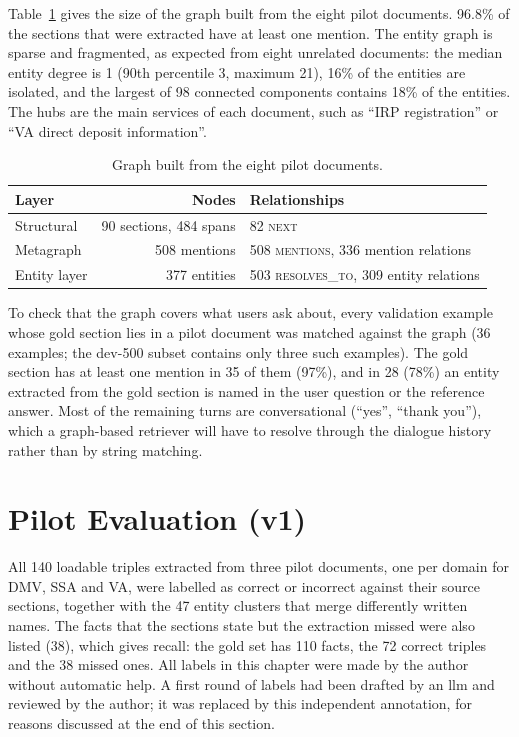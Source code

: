 Table~\ref{tab:kg:build} gives the size of the graph built from the eight pilot
documents. 96.8\% of the sections that were extracted have at least one mention.
The entity graph is sparse and fragmented, as expected from eight unrelated
documents: the median entity degree is 1 (90th percentile 3, maximum 21), 16\% of
the entities are isolated, and the largest of 98 connected components contains
18\% of the entities. The hubs are the main services of each document, such as
``IRP registration'' or ``VA direct deposit information''.

\begin{table}[ht]
    \centering
    \caption{Graph built from the eight pilot documents.}
    \label{tab:kg:build}
    \begin{tabular}{lrl}
        \toprule
        Layer & Nodes & Relationships \\
        \midrule
        Structural & 90 sections, 484 spans & 82 \textsc{next} \\
        Metagraph  & 508 mentions & 508 \textsc{mentions}, 336 mention relations \\
        Entity layer & 377 entities & 503 \textsc{resolves\_to}, 309 entity relations \\
        \bottomrule
    \end{tabular}
\end{table}

To check that the graph covers what users ask about, every validation example whose
gold section lies in a pilot document was matched against the graph (36 examples;
the dev-500 subset contains only three such examples). The gold section has at least
one mention in 35 of them (97\%), and in 28 (78\%) an entity extracted from the gold
section is named in the user question or the reference answer. Most of the
remaining turns are conversational (``yes'', ``thank you''), which a graph-based
retriever will have to resolve through the dialogue history rather than by string
matching.


\section{Pilot Evaluation (v1)}\label{sec:kg:eval}

All 140 loadable triples extracted from three pilot documents, one per domain for
DMV, SSA and VA, were labelled as correct or incorrect against their source sections,
together with the 47 entity clusters that merge differently written names. The facts
that the sections state but the extraction missed were also listed (38), which gives
recall: the gold set has 110 facts, the 72 correct triples and the 38 missed ones. All
labels in this chapter were made by the author without automatic help. A first round of
labels had been drafted by an \gls{llm} and reviewed by the author; it was replaced by
this independent annotation, for reasons discussed at the end of this section.

